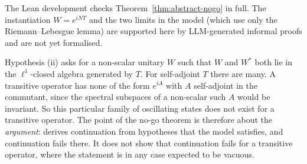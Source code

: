 The Lean development checks Theorem~\ref{thm:abstract-nogo} in full. The instantiation
$W=e^{iNT}$ and the two limits in the model (which use only the Riemann--Lebesgue lemma) are
supported here by LLM-generated informal proofs and are not yet formalised.

\begin{remark}\label{rem:where}
Hypothesis (ii) asks for a non-scalar unitary $W$ such that $W$ and $W^*$ both lie in the
$\ell^1$-closed algebra generated by $T$. For self-adjoint $T$ there are many. A transitive
operator has none of the form $e^{iA}$ with $A$ self-adjoint in the commutant, since the
spectral subspaces of a non-scalar such $A$ would be invariant. So this particular family of
oscillating states does not exist for a transitive operator. The point of the no-go theorem is
therefore about the \emph{argument}: \paper{} derives continuation from hypotheses that the
model satisfies, and continuation fails there. It does not show that continuation fails for a
transitive operator, where the statement is in any case expected to be vacuous.
\end{remark}

